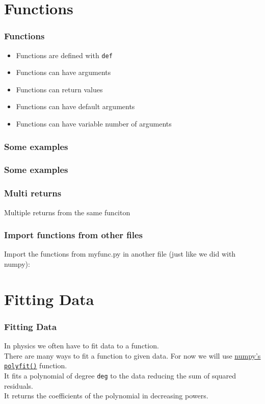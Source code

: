 \documentclass{beamer}
\newcommand{\hrefu}[2]{\underline{\href{#1}{#2}}}
\begin{document}
\section{Functions}
\begin{frame}
  \frametitle{Functions}
  \begin{itemize}
    \item Functions are defined with \texttt{def}
    \item Functions can have arguments
    \item Functions can return values
    \item Functions can have default arguments
    \item Functions can have variable number of arguments
  \end{itemize}
\end{frame}

\begin{frame}
  \frametitle{Some examples}
  
\end{frame}
\begin{frame}
  \frametitle{Some examples}
  
\end{frame}
\begin{frame}
  \frametitle{Multi returns}
  Multiple returns from the same funciton
  
\end{frame}
\begin{frame}
  \frametitle{Import functions from other files}
  
  \vspace{5mm}
  Import the functions from myfunc.py in another file (just like we did with numpy):
  
\end{frame}
\section{Fitting Data}
\begin{frame}
  \frametitle{Fitting Data}
  In physics we often have to fit data to a function. \\ There are many ways to fit a function to given data. For now we will use \hrefu{https://numpy.org/}{numpy's} \hrefu{https://numpy.org/doc/stable/reference/generated/numpy.polyfit.html}{\texttt{polyfit()}} function.\\ \vspace{5mm}
  It fits a polynomial of degree \texttt{deg} to the data reducing the sum of squared residuals.\\ It returns the coefficients of the polynomial in decreasing powers.\\
\end{frame}
\end{document}
